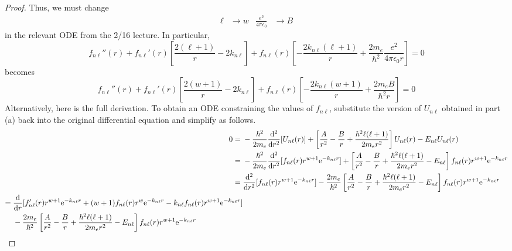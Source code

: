 \documentclass[../psets.tex]{subfiles}
\begin{document}
\begin{enumerate}
\begin{enumerate}
\begin{proof}
            Thus, we must change
            \begin{align*}
                \ell &\to w&
                \frac{e^2}{4\pi\epsilon_0} &\to B
            \end{align*}
            in the relevant ODE from the 2/16 lecture. In particular,
            \begin{equation*}
                f_{n\ell}''(r)+f_{n\ell}'(r)\left[ \frac{2(\ell+1)}{r}-2k_{n\ell} \right]+f_{n\ell}(r)\left[ -\frac{2k_{n\ell}(\ell+1)}{r}+\frac{2m_e}{\hbar^2}\frac{e^2}{4\pi\epsilon_0r} \right] = 0
            \end{equation*}
            becomes
            \begin{equation*}
                \boxed{f_{n\ell}''(r)+f_{n\ell}'(r)\left[ \frac{2(w+1)}{r}-2k_{n\ell} \right]+f_{n\ell}(r)\left[ -\frac{2k_{n\ell}(w+1)}{r}+\frac{2m_eB}{\hbar^2r} \right] = 0}
            \end{equation*}
            Alternatively, here is the full derivation. To obtain an ODE constraining the values of $f_{n\ell}$, substitute the version of $U_{n\ell}$ obtained in part (a) back into the original differential equation and simplify as follows.
            \begingroup
            \allowdisplaybreaks
            \begin{align*}
                0 ={}& -\frac{\hbar^2}{2m_e}\dv[2]{r}[U_{n\ell}(r)]+\left[ \frac{A}{r^2}-\frac{B}{r}+\frac{\hbar^2\ell(\ell+1)}{2m_er^2} \right]U_{n\ell}(r)-E_{n\ell}U_{n\ell}(r)\\
                ={}& -\frac{\hbar^2}{2m_e}\dv[2]{r}[f_{n\ell}(r)r^{w+1}\e[-k_{n\ell}r]]+\left[ \frac{A}{r^2}-\frac{B}{r}+\frac{\hbar^2\ell(\ell+1)}{2m_er^2}-E_{n\ell} \right]f_{n\ell}(r)r^{w+1}\e[-k_{n\ell}r]\\
                ={}& \dv[2]{r}[f_{n\ell}(r)r^{w+1}\e[-k_{n\ell}r]]-\frac{2m_e}{\hbar^2}\left[ \frac{A}{r^2}-\frac{B}{r}+\frac{\hbar^2\ell(\ell+1)}{2m_er^2}-E_{n\ell} \right]f_{n\ell}(r)r^{w+1}\e[-k_{n\ell}r]\\
                \begin{split}
                    ={}& \dv{r}[f_{n\ell}'(r)r^{w+1}\e[-k_{n\ell}r]+(w+1)f_{n\ell}(r)r^w\e[-k_{n\ell}r]-k_{n\ell}f_{n\ell}(r)r^{w+1}\e[-k_{n\ell}r]]\\
                    & -\frac{2m_e}{\hbar^2}\left[ \frac{A}{r^2}-\frac{B}{r}+\frac{\hbar^2\ell(\ell+1)}{2m_er^2}-E_{n\ell} \right]f_{n\ell}(r)r^{w+1}\e[-k_{n\ell}r]
                \end{split}\\

\end{align*}
\end{proof}
\end{enumerate}
\end{enumerate}
\end{document}
